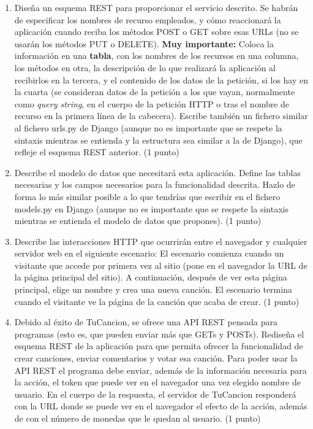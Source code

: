 \begin{enumerate}
  \item Diseña un esquema REST para proporcionar el servicio descrito. Se habrán de especificar los nombres de recurso empleados, y cómo reaccionará la aplicación cuando reciba los métodos POST o GET sobre esas URLs (no se usarán los métodos PUT o DELETE). \textbf{Muy importante:} Coloca la información en una \textbf{tabla}, con los nombres de los recursos en una columna, los métodos en otra, la descripción de lo que realizará la aplicación al recibirlos en la tercera, y el contenido de los datos de la petición, si los hay en la cuarta (se consideran datos de la petición a los que vayan, normalmente como \emph{query string}, en el cuerpo de la petición HTTP o tras el nombre de recurso en la primera línea de la cabecera). Escribe también un fichero similar al fichero urls.py de Django (aunque no es importante que se respete la sintaxis mientras se entienda y la estructura sea similar a la de Django), que refleje el esquema REST anterior. (1 punto)

  \item Describe el modelo de datos que necesitará esta aplicación. Define las tablas necesarias y los campos necesarios para la funcionalidad descrita. Hazlo de forma lo más similar posible a lo que tendrías que escribir en el fichero models.py en Django (aunque no es importante que se respete la sintaxis mientras se entienda el modelo de datos que propones). (1 punto)

  \item Describe las interacciones HTTP que ocurrirán entre el navegador y cualquier servidor web en el siguiente escenario: El escenario comienza cuando un visitante que accede por primera vez al sitio (pone en el navegador la URL de la página principal del sitio). A continuación, después de ver esta página principal, elige un nombre y crea una nueva canción. El escenario termina cuando el visitante ve la página de la canción que acaba de crear. (1 punto)

  \item Debido al éxito de TuCancion, se ofrece una API REST pensada para programas (esto es, que pueden enviar más que GETs y POSTs). Rediseña el esquema REST de la aplicación para que permita ofrecer la funcionalidad de crear canciones, enviar comentarios y votar esa canción. Para poder usar la API REST el programa debe enviar, además de la información necesaria para la acción, el token que puede ver en el navegador una vez elegido nombre de usuario. En el cuerpo de la respuesta, el servidor de TuCancion responderá con la URL donde se puede ver en el navegador el efecto de la acción, además de con el número de monedas que le quedan al usuario. (1 punto)


\end{enumerate}
